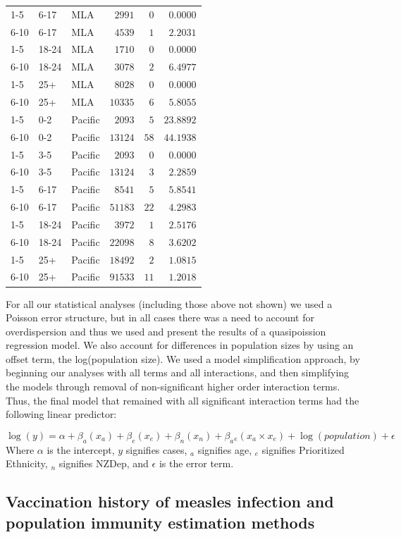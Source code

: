 \documentclass{article}
\begin{document}
\begin{table}[hbtp]
\begin{center}
\begin{tabular}{lllrrr}
1-5&6-17&MLA&$   2991$&$  0$&$ 0.0000$\tabularnewline
6-10&6-17&MLA&$   4539$&$  1$&$ 2.2031$\tabularnewline
1-5&18-24&MLA&$   1710$&$  0$&$ 0.0000$\tabularnewline
6-10&18-24&MLA&$   3078$&$  2$&$ 6.4977$\tabularnewline
1-5&25+&MLA&$   8028$&$  0$&$ 0.0000$\tabularnewline
6-10&25+&MLA&$  10335$&$  6$&$ 5.8055$\tabularnewline
1-5&0-2&Pacific&$   2093$&$  5$&$23.8892$\tabularnewline
6-10&0-2&Pacific&$  13124$&$ 58$&$44.1938$\tabularnewline
1-5&3-5&Pacific&$   2093$&$  0$&$ 0.0000$\tabularnewline
6-10&3-5&Pacific&$  13124$&$  3$&$ 2.2859$\tabularnewline
1-5&6-17&Pacific&$   8541$&$  5$&$ 5.8541$\tabularnewline
6-10&6-17&Pacific&$  51183$&$ 22$&$ 4.2983$\tabularnewline
1-5&18-24&Pacific&$   3972$&$  1$&$ 2.5176$\tabularnewline
6-10&18-24&Pacific&$  22098$&$  8$&$ 3.6202$\tabularnewline
1-5&25+&Pacific&$  18492$&$  2$&$ 1.0815$\tabularnewline
6-10&25+&Pacific&$  91533$&$ 11$&$ 1.2018$\tabularnewline
\hline
\end{tabular}\end{center}\label{table:percap}
\end{table}

For all our statistical analyses (including those above not shown) we used a Poisson error structure, but in all cases there was a need to account for overdispersion and thus we used and present the results of a quasipoission regression model. We also account for differences in population sizes by using an offset term, the log(population size). We used a model simplification approach, by beginning our analyses with all terms and all interactions, and then simplifying the models through removal of non-significant higher order interaction terms. Thus, the final model that remained with all significant interaction terms had the following linear predictor:

\begin{equation} \label{eq:reg}
 \log(y) = \alpha + \beta _a (x_a)+ \beta _e(x_e)+ \beta _n (x_n) + \beta _a{}_e(x_a \times x_e)+ \log(population)  + \epsilon
  \end{equation}
Where $\alpha$ is the intercept, $y$ signifies cases, $_a$ signifies age, $_e$ signifies Prioritized Ethnicity, $_n$ signifies NZDep, and $\epsilon$ is the error term.



\subsection{Vaccination history of measles infection and population immunity estimation methods}
\label{sub:immunestat}
\end{document}
